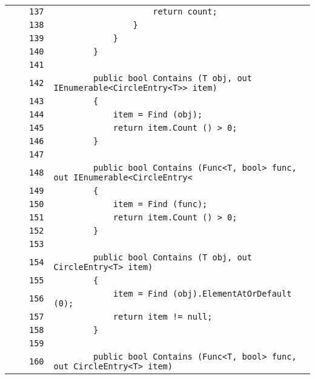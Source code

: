 \documentclass[a4paper,10pt]{article}
\begin{document}
\begin{longtable}[l]{lrrl}
\cellcolor{gray} &  & \verb~137~ & \verb~                    return count;~\\
\cellcolor{gray} &  & \verb~138~ & \verb~                }~\\
\cellcolor{gray} &  & \verb~139~ & \verb~            }~\\
\cellcolor{gray} &  & \verb~140~ & \verb~        }~\\
\cellcolor{gray} &  & \verb~141~ & \verb~~\\
\cellcolor{gray} &  & \verb~142~ & \verb~        public bool Contains (T obj, out IEnumerable<CircleEntry<T>> item)~\\
\cellcolor{gray} &  & \verb~143~ & \verb~        {~\\
\cellcolor{gray} &  & \verb~144~ & \verb~            item = Find (obj);~\\
\cellcolor{gray} &  & \verb~145~ & \verb~            return item.Count () > 0;~\\
\cellcolor{gray} &  & \verb~146~ & \verb~        }~\\
\cellcolor{gray} &  & \verb~147~ & \verb~~\\
\cellcolor{gray} &  & \verb~148~ & \verb~        public bool Contains (Func<T, bool> func, out IEnumerable<CircleEntry<~\\
\cellcolor{gray} &  & \verb~149~ & \verb~        {~\\
\cellcolor{gray} &  & \verb~150~ & \verb~            item = Find (func);~\\
\cellcolor{gray} &  & \verb~151~ & \verb~            return item.Count () > 0;~\\
\cellcolor{gray} &  & \verb~152~ & \verb~        }~\\
\cellcolor{gray} &  & \verb~153~ & \verb~~\\
\cellcolor{gray} &  & \verb~154~ & \verb~        public bool Contains (T obj, out CircleEntry<T> item)~\\
\cellcolor{gray} &  & \verb~155~ & \verb~        {~\\
\cellcolor{gray} &  & \verb~156~ & \verb~            item = Find (obj).ElementAtOrDefault (0);~\\
\cellcolor{gray} &  & \verb~157~ & \verb~            return item != null;~\\
\cellcolor{gray} &  & \verb~158~ & \verb~        }~\\
\cellcolor{gray} &  & \verb~159~ & \verb~~\\
\cellcolor{gray} &  & \verb~160~ & \verb~        public bool Contains (Func<T, bool> func, out CircleEntry<T> item)~\\

\end{longtable}
\end{document}
